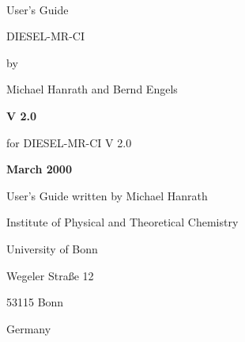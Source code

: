 \begin{titlepage}

\setcounter{page}{1}
\thispagestyle{empty}


\ 
\bigskip
\bigskip
\bigskip
\bigskip
\bigskip

{\Huge \bf
\centerline{User's Guide}
}
\bigskip
\bigskip
\bigskip
{\huge \bf
\centerline {DIESEL-MR-CI}
\bigskip
}
\centerline{by}
\bigskip
\centerline{Michael Hanrath and Bernd Engels}
\bigskip
\bigskip
\bigskip
\bigskip
\bigskip
\bigskip

\centerline{\large \bf V 2.0}
\medskip
\centerline{for DIESEL-MR-CI V 2.0}
\bigskip
\centerline{\large \bf March 2000}
\bigskip
\bigskip

\bigskip
\bigskip
\bigskip
\bigskip
\bigskip
\bigskip
\bigskip



\bigskip

\bigskip
\centerline{User's Guide written by Michael Hanrath}

\bigskip
\bigskip
\bigskip
\centerline{Institute of Physical and Theoretical Chemistry}
\smallskip
\centerline{University of Bonn}
\medskip
\centerline{Wegeler Stra\ss e 12}
\centerline{53115 Bonn}
\centerline{Germany}


\vfill
\pagebreak

\end{titlepage}

